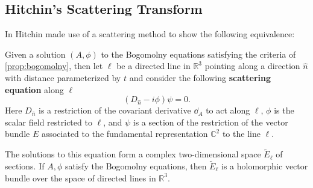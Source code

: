 		
	\subsection{Hitchin's Scattering Transform}
	In \cite{hitchin1982} Hitchin made use of a scattering method to show the following equivalence:
	\begin{theorem}[Hitchin]
		Given a solution $(A, \phi)$ to the Bogomolny equations satisfying the criteria of \ref{prop:bogomolny}, then let $\ell$ be a directed line in $\mathbb R^3$ pointing along a direction $\hat n$ with distance parameterized by $t$ and consider the following \textbf{scattering equation} along $\ell$
		\begin{equation}
			(D_{\hat n} - i \phi) \psi = 0.
		\end{equation}
		Here $D_{\hat n}$ is a restriction of the covariant derivative $\dd_A$ to act along $\ell$, $\phi$ is the scalar field restricted to $\ell$, and $\psi$ is a section of the restriction of the vector bundle $E$ associated to the fundamental representation $\mathbb C^2$ to the line $\ell$. 
		
		The solutions to this equation form a complex two-dimensional space $\tilde E_{\ell}$ of sections. If $A, \phi$ satisfy the Bogomolny equations, then $\tilde E_\ell$ is a holomorphic vector bundle over the space of directed lines in $\mathbb R^3$.
	\end{theorem}
	
